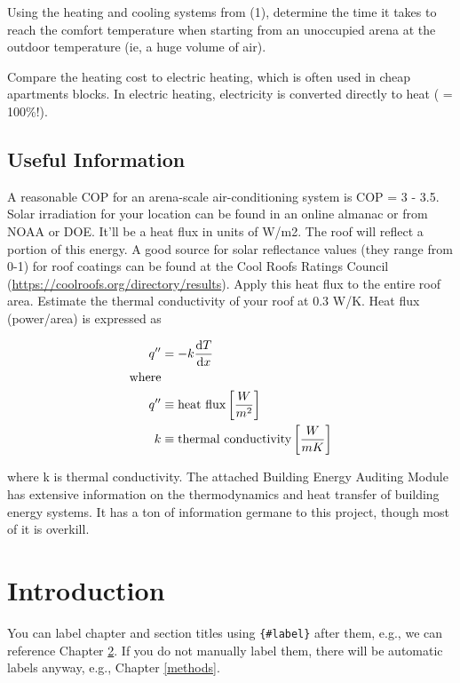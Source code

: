 \documentclass[
]{book}
\begin{document}
Using the heating and cooling systems from (1), determine the time it takes to reach the comfort temperature when starting from an unoccupied arena at the outdoor temperature (ie, a huge volume of air).

Compare the heating cost to electric heating, which is often used in cheap apartments blocks. In electric heating, electricity is converted directly to heat ( = 100\%!).

\hypertarget{useful-information}{%
\section{Useful Information}\label{useful-information}}

A reasonable COP for an arena-scale air-conditioning system is COP = 3 - 3.5.
Solar irradiation for your location can be found in an online almanac or from NOAA or DOE. It'll be a heat flux in units of W/m2. The roof will reflect a portion of this energy. A good source for solar reflectance values (they range from 0-1) for roof coatings can be found at the Cool Roofs Ratings Council (\url{https://coolroofs.org/directory/results}). Apply this heat flux to the entire roof area.
Estimate the thermal conductivity of your roof at 0.3 W/K. Heat flux (power/area) is expressed as

\begin{align}
 q'' &= -k \frac{\text dT}{\text dx} \\
 \text{where}\hfill \notag \\
 q'' &\equiv \text{heat flux} \left[ \frac{W}{m^2} \right]  \notag \\
 k &\equiv \text{thermal conductivity} \left[ \frac{W}{m K} \right]  \notag 
\end{align}

where k is thermal conductivity.
The attached Building Energy Auditing Module has extensive information on the thermodynamics and heat transfer of building energy systems. It has a ton of information germane to this project, though most of it is overkill.

\hypertarget{intro}{%
\chapter{Introduction}\label{intro}}

You can label chapter and section titles using \texttt{\{\#label\}} after them, e.g., we can reference Chapter \ref{intro}. If you do not manually label them, there will be automatic labels anyway, e.g., Chapter \ref{methods}.
\end{document}
